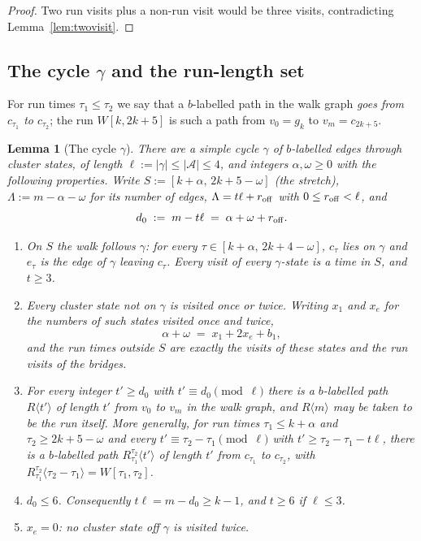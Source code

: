 \documentclass[11pt]{article}
\newtheorem{lemma}[theorem]{Lemma}
\theoremstyle{definition}
\begin{document}
\begin{proof}
Two run visits plus a non-run visit would be three visits, contradicting
Lemma~\ref{lem:twovisit}.
\end{proof}

\subsection{The cycle \texorpdfstring{$\gamma$}{gamma} and the run-length set}

For run times $\tau_1\le\tau_2$ we say that a $b$-labelled path in the walk
graph \emph{goes from $c_{\tau_1}$ to $c_{\tau_2}$}; the run $W[k,2k+5]$ is
such a path from $v_0=g_k$ to $v_m=c_{2k+5}$.

\begin{lemma}[The cycle $\gamma$]\label{lem:gamma}
There are a simple cycle $\gamma$ of $b$-labelled edges through
cluster states, of length $\ell:=|\gamma|\le|\mathcal A|\le4$, and integers
$\alpha,\omega\ge0$ with the following properties. Write
$S:=[k+\alpha,\,2k+5-\omega]$ (the \emph{stretch}), $\Lambda:=m-\alpha-\omega$
for its number of edges, $\Lambda=t\ell+r_{\rm off}$ with $0\le r_{\rm
off}<\ell$, and
\[
d_0\;:=\;m-t\ell\;=\;\alpha+\omega+r_{\rm off}.
\]
\begin{enumerate}[leftmargin=2.2em,itemsep=2pt,label=(\roman*)]
\item On $S$ the walk follows $\gamma$: for every $\tau\in[k+\alpha,\,2k+4-\omega]$,
$c_\tau$ lies on $\gamma$ and $e_\tau$ is the edge of $\gamma$ leaving
$c_\tau$. Every visit of every $\gamma$-state is a time in $S$, and $t\ge3$.
\item Every cluster state not on $\gamma$ is visited once or twice. Writing
$x_1$ and $x_e$ for the numbers of such states visited once and twice,
\[
\alpha+\omega \;=\; x_1+2x_e+b_1 ,
\]
and the run times outside $S$ are exactly the visits of these states and
the run visits of the bridges.
\item For every integer $t'\ge d_0$ with $t'\equiv d_0\pmod\ell$ there is a
$b$-labelled path $R\langle t'\rangle$ of length $t'$ from $v_0$ to $v_m$ in
the walk graph, and $R\langle m\rangle$ may be taken to be the run itself.
More generally, for run times $\tau_1\le k+\alpha$ and $\tau_2\ge2k+5-\omega$
and every $t'\equiv\tau_2-\tau_1\pmod\ell$ with $t'\ge\tau_2-\tau_1-t\ell$,
there is a $b$-labelled path $R_{\tau_1}^{\tau_2}\langle t'\rangle$ of length
$t'$ from $c_{\tau_1}$ to $c_{\tau_2}$, with
$R_{\tau_1}^{\tau_2}\langle\tau_2-\tau_1\rangle=W[\tau_1,\tau_2]$.
\item $d_0\le6$. Consequently $t\ell=m-d_0\ge k-1$, and $t\ge6$ if $\ell\le3$.
\item $x_e=0$: no cluster state off $\gamma$ is visited twice.
\end{enumerate}
\end{lemma}
\end{document}
